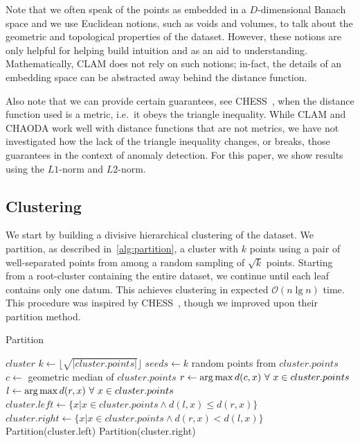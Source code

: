 Note that we often speak of the points as embedded in a $D$-dimensional Banach space and we use Euclidean notions, such as voids and volumes, to talk about the geometric and topological properties of the dataset.
However, these notions are only helpful for helping build intuition and as an aid to understanding.
Mathematically, CLAM does not rely on such notions; in-fact, the details of an embedding space can be abstracted away behind the distance function.

Also note that we can provide certain guarantees, see CHESS~\cite{ishaq2019clustered}, when the distance function used is a metric, i.e.\ it obeys the triangle inequality.
While CLAM and CHAODA work well with distance functions that are not metrics, we have not investigated how the lack of the triangle inequality changes, or breaks, those guarantees in the context of anomaly detection.
For this paper, we show results using the $L1$-norm and $L2$-norm.


\subsection{Clustering}
\label{subsec:methods:clustering}

We start by building a divisive hierarchical clustering of the dataset.
We partition, as described in~\ref{alg:partition}, a cluster with $k$ points using a pair of well-separated points from among a random sampling of $\sqrt k$ points.
Starting from a root-cluster containing the entire dataset, we continue until each leaf contains only one datum.
This achieves clustering in expected $\mathcal{O}(n \lg n)$ time.
This procedure was inspired by CHESS~\cite{ishaq2019clustered}, though we improved upon their partition method.

\begin{algorithm} %
\caption{Partition} %
\label{alg:partition} %
\begin{algorithmic}[1] %
    \REQUIRE $cluster$
    \STATE $k \leftarrow \lfloor \sqrt{|cluster.points|} \rfloor$
    \STATE $seeds \leftarrow k$ random points from $cluster.points$
    \STATE $c \leftarrow$ geometric median of $cluster.points$
    \STATE $r \leftarrow \operatorname*{arg\,max} d(c,x) \ \forall \ x \in cluster.points$
    \STATE $l \leftarrow \operatorname*{arg\,max} d(r,x) \ \forall \ x \in cluster.points$
    \STATE $cluster.left \leftarrow \{x | x \in cluster.points \land d(l,x) \le d(r,x)\}$
    \STATE $cluster.right \leftarrow \{x | x \in cluster.points \land d(r,x) < d(l,x)\}$
        \STATE Partition(cluster.left)
    \ENDIF
        \STATE Partition(cluster.right)
    \ENDIF
\end{algorithmic}
\end{algorithm}

